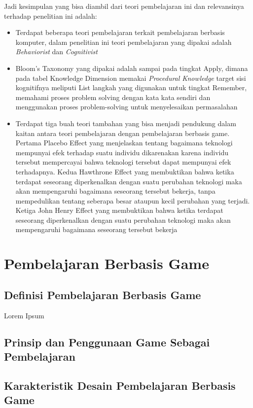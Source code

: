 	Jadi kesimpulan yang bisa diambil dari teori pembelajaran ini dan relevansinya terhadap penelitian ini adalah:
	\begin{itemize}
		\item Terdapat beberapa teori pembelajaran terkait pembelajaran berbasis komputer, dalam penelitian ini teori pembelajaran yang dipakai adalah \textit{Behaviorist} dan \textit{Cognitivist}
		\item Bloom’s Taxonomy yang dipakai adalah sampai pada tingkat Apply, dimana pada tabel Knowledge Dimension memakai \textit{Procedural Knowledge} target sisi kognitifnya meliputi List langkah yang digunakan untuk tingkat Remember, memahami proses problem solving dengan kata kata sendiri dan menggunakan proses problem-solving untuk menyelesaikan permasalahan
		\item Terdapat tiga buah teori tambahan yang bisa menjadi pendukung dalam kaitan antara teori pembelajaran dengan pembelajaran berbasis game. Pertama Placebo Effect yang menjelaskan tentang bagaimana teknologi mempunyai efek terhadap suatu individu dikarenakan karena individu tersebut mempercayai bahwa teknologi tersebut dapat mempunyai efek terhadapnya. Kedua Hawthrone Effect yang membuktikan bahwa ketika terdapat seseorang diperkenalkan dengan suatu perubahan teknologi maka akan mempengaruhi bagaimana seseorang tersebut bekerja, tanpa mempedulikan tentang seberapa besar ataupun kecil perubahan yang terjadi. Ketiga John Henry Effect yang membuktikan bahwa ketika terdapat seseorang diperkenalkan dengan suatu perubahan teknologi maka akan mempengaruhi bagaimana seseorang tersebut bekerja
	\end{itemize}
	
\section{Pembelajaran Berbasis Game}
	\subsection{Definisi Pembelajaran Berbasis Game}
	Lorem Ipsum
	\subsection{Prinsip dan Penggunaan Game Sebagai Pembelajaran}
	\subsection{Karakteristik Desain Pembelajaran Berbasis Game}
	
